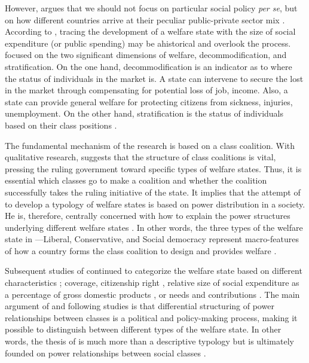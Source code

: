 \documentclass[12pt, letterpage, notitlepage]{article}
\begin{document}
However, \citet{Gosta1990} argues that we should not focus on particular social policy \textit{per se}, but on how different countries arrive at their peculiar public-private sector mix \citep[2]{Gosta1990}. According to \citet{Gosta1990}, tracing the development of a welfare state with the size of social expenditure (or public spending) may be ahistorical and overlook the process. \citet{Gosta1990} focused on the two significant dimensions of welfare, decommodification, and stratification. On the one hand, decommodification is an indicator as to where the status of individuals in the market is. A state can intervene to secure the lost in the market through compensating for potential loss of job, income. Also, a state can provide general welfare for protecting citizens from sickness, injuries, unemployment. On the other hand, stratification is the status of individuals based on their class positions \citep{Gosta1990}.\par

The fundamental mechanism of the research is based on a class coalition. With qualitative research, \citet{Gosta1990} suggests that the structure of class coalitions is vital, pressing the ruling government toward specific types of welfare states. Thus, it is essential which classes go to make a coalition and whether the coalition successfully takes the ruling initiative of the state. It implies that the attempt of \citet{Gosta1990} to develop a typology of welfare states is based on power distribution in a society. He is, therefore, centrally concerned with how to explain the power structures underlying different welfare states \citep[88]{Kemeny1995}. In other words, the three types of the welfare state in \citet{Gosta1990}---Liberal, Conservative, and Social democracy represent macro-features of how a country forms the class coalition to design and provides welfare \citep[646]{Scruggs2008}.

Subsequent studies of \citet{Gosta1990} continued to categorize the welfare state based on different characteristics \citep[14]{Arcanjo2006}; coverage, citizenship right \citep{Ferrera1996}, relative size of social expenditure as a percentage of gross domestic products \citep{Bonoli1997}, or needs and contributions \citep{Korpi1998}. The main argument of \citet{Gosta1990} and following studies is that differential structuring of power relationships between classes is a political and policy-making process, making it possible to distinguish between different types of the welfare state. In other words, the thesis of \citet{Gosta1990} is much more than a descriptive typology but is ultimately founded on power relationships between social classes \citep[89]{Kemeny1995}.\par
\end{document}
